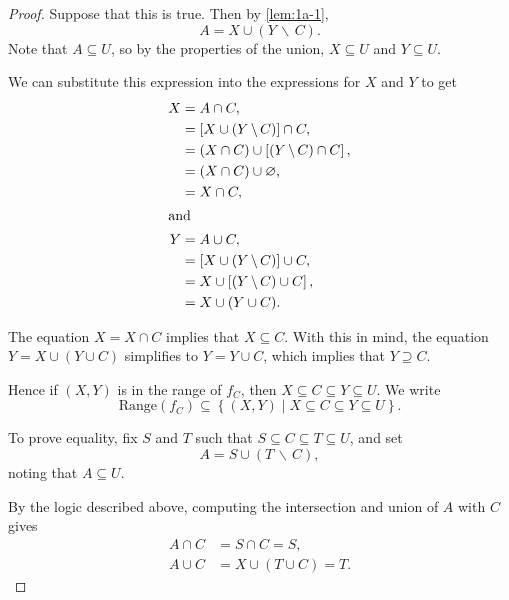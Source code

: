 \begin{enumerate}
\begin{enumerate}
\begin{proof}
                    Suppose that this is true.
                    Then by \cref{lem:1a-1},
                    \[ A = X \cup (Y \, \backslash \, C). \]
                    Note that $A \subseteq U$, so by the properties of the union, $X \subseteq U$ and $Y \subseteq U$.

                    We can substitute this expression into the expressions for $X$ and $Y$ to get
                    \begin{align*}
                        X &= A \cap C, \\
                        &= \left[X \cup (Y \, \backslash \, C)\right] \cap C, \\
                        &= (X \cap C) \cup \left[(Y \, \backslash \, C) \cap C\right], \\
                        &= (X \cap C) \cup \varnothing, \\
                        &= X \cap C, \\
                        \intertext{and}
                        Y &= A \cup C, \\
                        &= \left[X \cup (Y \, \backslash \, C)\right] \cup C, \\
                        &= X \cup \left[(Y \, \backslash \, C) \cup C\right], \\
                        &= X \cup (Y \cup C).
                    \end{align*}

                    The equation $X = X \cap C$ implies that $X \subseteq C$.
                    With this in mind, the equation $Y = X \cup (Y \cup C)$ simplifies to $Y = Y \cup C$, which implies that $Y \supseteq C$.

                    Hence if $(X, Y)$ is in the range of $f_C$, then $X \subseteq C \subseteq Y \subseteq U$.
                    We write
                    \[ \mathrm{Range}(f_C) \subseteq \left\{(X, Y) \; \big| \; X \subseteq C \subseteq Y \subseteq U \right\}. \]

                    \medskip

                    To prove equality, fix $S$ and $T$ such that $S \subseteq C \subseteq T \subseteq U$, and set
                    \[ A = S \cup (T \, \backslash \, C), \]
                    noting that $A \subseteq U$.

                    \smallskip

                    By the logic described above, computing the intersection and union of $A$ with $C$ gives
                    \begin{align*}
                        A \cap C &= S \cap C = S, \\
                        A \cup C &= X \cup (T \cup C) = T.
                    \end{align*}


\end{proof}
\end{enumerate}
\end{enumerate}
